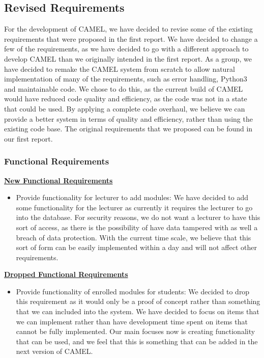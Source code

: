 \subsection*{Revised Requirements}
	For the development of CAMEL, we have decided to revise some of the existing requirements that were proposed in the first report. We have decided to change a few of the requirements, as we have decided to go with a different approach to develop CAMEL than we originally intended in the first report. As a group, we have decided to remake the CAMEL system from scratch to allow natural implementation of many of the requirements, such as error handling, Python3 and maintainable code. We chose to do this, as the current build of CAMEL would have reduced code quality and efficiency, as the code was not in a state that could be used. By applying a complete code overhaul, we believe we can provide a better system in terms of quality and efficiency, rather than using the existing code base. The original requirements that we proposed can be found in our first report. \\    
	
	\subsubsection*{Functional Requirements}
	\underline{\textbf{New Functional Requirements}}
	\begin{itemize}
		\item Provide functionality for lecturer to add modules: We have decided to add some functionality for the lecturer as currently it requires the lecturer to go into the database. For security reasons, we do not want a lecturer to have this sort of access, as there is the possibility of have data tampered with as well a breach of data protection. With the current time scale, we believe that this sort of form can be easily implemented within a day and will not affect other requirements. 
	\end{itemize}
	
	\underline{\textbf{Dropped Functional Requirements}}
	\begin{itemize}
		\item Provide functionality of enrolled modules for students: We decided to drop this requirement as it would only be a proof of concept rather than something that we can included into the system. We have decided to focus on items that we can implement rather than have development time spent on items that cannot be fully implemented. Our main focuses now is creating functionality that can be used, and we feel that this is something that can be added in the next version of CAMEL.  
	\end{itemize}
			
